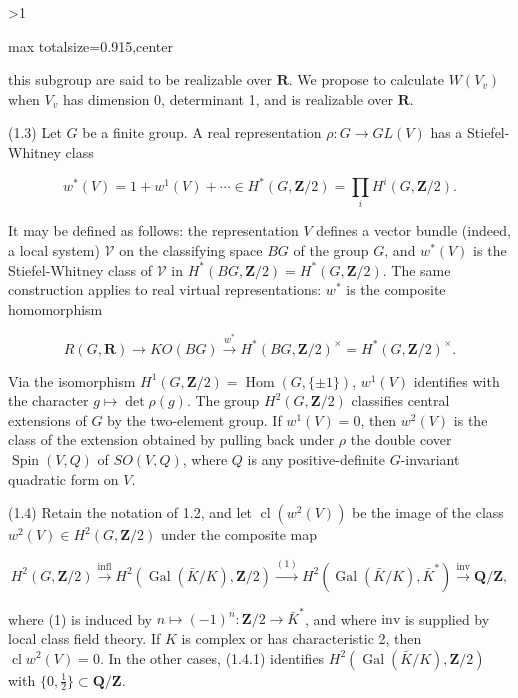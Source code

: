 \documentclass[9pt,twoside]{extarticle}
\newcommand{\EditionPage}[3]{%
  \ifnum#1>1\clearpage\fi
  \pdfbookmark[1]{Printed folio #2}{en-folio-#2}%
  \hypertarget{en-page-#1}{}%
  \noindent\begin{adjustbox}{max totalsize={\textwidth}{0.915\textheight},center}
  \begin{minipage}[t]{\textwidth}
  \fontsize{8.45}{10.05}\selectfont\justifying
  #3
  \end{minipage}
  \end{adjustbox}%
}
\begin{document}
\EditionPage{3}{301}{%
this subgroup are said to be realizable over \(\mathbf R\). We propose to calculate \(W(V_v)\) when \(V_v\) has dimension 0, determinant 1, and is realizable over \(\mathbf R\).\par

(1.3) Let \(G\) be a finite group. A real representation \(\rho:G\to GL(V)\) has a Stiefel-Whitney class\par

\[
w^*(V)=1+w^1(V)+\cdots\in H^*(G,\mathbf Z/2)=\prod_i H^i(G,\mathbf Z/2).
\]

It may be defined as follows: the representation \(V\) defines a vector bundle (indeed, a local system) \(\mathcal V\) on the classifying space \(BG\) of the group \(G\), and \(w^*(V)\) is the Stiefel-Whitney class of \(\mathcal V\) in \(H^*(BG,\mathbf Z/2)=H^*(G,\mathbf Z/2)\). The same construction applies to real virtual representations: \(w^*\) is the composite homomorphism\par

\[
R(G,\mathbf R)\longrightarrow KO(BG)\overset{w^*}{\longrightarrow}H^*(BG,\mathbf Z/2)^\times=H^*(G,\mathbf Z/2)^\times.
\]

Via the isomorphism \(H^1(G,\mathbf Z/2)=\operatorname{Hom}(G,\{\pm1\})\), \(w^1(V)\) identifies with the character \(g\mapsto\det\rho(g)\). The group \(H^2(G,\mathbf Z/2)\) classifies central extensions of \(G\) by the two-element group. If \(w^1(V)=0\), then \(w^2(V)\) is the class of the extension obtained by pulling back under \(\rho\) the double cover \(\operatorname{Spin}(V,Q)\) of \(SO(V,Q)\), where \(Q\) is any positive-definite \(G\)-invariant quadratic form on \(V\).\par

(1.4) Retain the notation of 1.2, and let \(\operatorname{cl}(w^2(V))\) be the image of the class \(w^2(V)\in H^2(G,\mathbf Z/2)\) under the composite map\par

\[
\tag{1.4.1}
H^2(G,\mathbf Z/2)\overset{\mathrm{infl}}{\longrightarrow}H^2(\operatorname{Gal}(\bar K/K),\mathbf Z/2)
\overset{(1)}{\longrightarrow}H^2(\operatorname{Gal}(\bar K/K),\bar K^*)
\overset{\mathrm{inv}}{\longrightarrow}\mathbf Q/\mathbf Z,
\]

where (1) is induced by \(n\mapsto(-1)^n:\mathbf Z/2\to\bar K^*\), and where \(\mathrm{inv}\) is supplied by local class field theory. If \(K\) is complex or has characteristic 2, then \(\operatorname{cl}w^2(V)=0\). In the other cases, (1.4.1) identifies \(H^2(\operatorname{Gal}(\bar K/K),\mathbf Z/2)\) with \(\{0,\tfrac12\}\subset\mathbf Q/\mathbf Z\).\par

}
\end{document}
